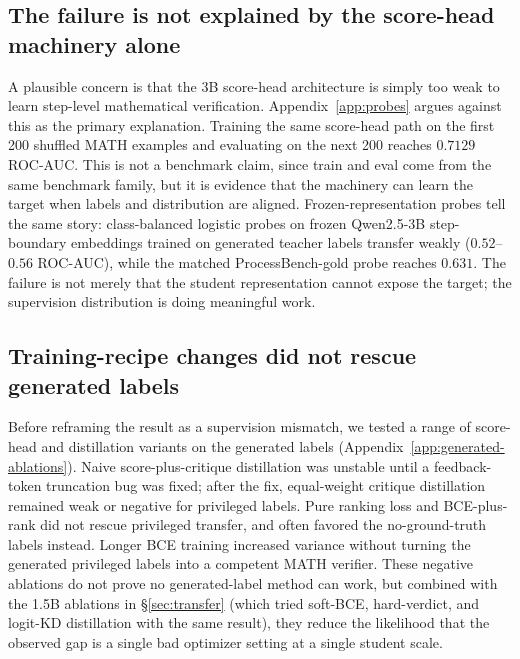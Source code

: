 \documentclass{article}
\begin{document}
\subsection{The failure is not explained by the score-head machinery alone}
\label{sec:mismatch-probes}
A plausible concern is that the 3B score-head architecture is simply too
weak to learn step-level mathematical verification. Appendix~\ref{app:probes}
argues against this as the primary explanation. Training the same score-head
path on the first 200 shuffled MATH examples and evaluating on the next 200
reaches $0.7129$ ROC-AUC. This is not a benchmark claim, since train and eval
come from the same benchmark family, but it is evidence that the machinery can
learn the target when labels and distribution are aligned. Frozen-representation
probes tell the same story: class-balanced logistic probes on frozen
Qwen2.5-3B step-boundary embeddings trained on generated teacher labels
transfer weakly ($0.52$--$0.56$ ROC-AUC), while the matched
ProcessBench-gold probe reaches $0.631$. The failure is not merely that the
student representation cannot expose the target; the supervision
distribution is doing meaningful work.

\subsection{Training-recipe changes did not rescue generated labels}
\label{sec:mismatch-ablations}
Before reframing the result as a supervision mismatch, we tested a range of
score-head and distillation variants on the generated labels
(Appendix~\ref{app:generated-ablations}). Naive score-plus-critique distillation
was unstable until a feedback-token truncation bug was fixed; after the fix,
equal-weight critique distillation remained weak or negative for privileged
labels. Pure ranking loss and BCE-plus-rank did not rescue privileged
transfer, and often favored the no-ground-truth labels instead. Longer BCE
training increased variance without turning the generated privileged labels
into a competent MATH verifier. These negative ablations do not prove no
generated-label method can work, but combined with the 1.5B ablations in
\S\ref{sec:transfer} (which tried soft-BCE, hard-verdict, and logit-KD
distillation with the same result), they reduce the likelihood that the
observed gap is a single bad optimizer setting at a single student scale.
\end{document}
